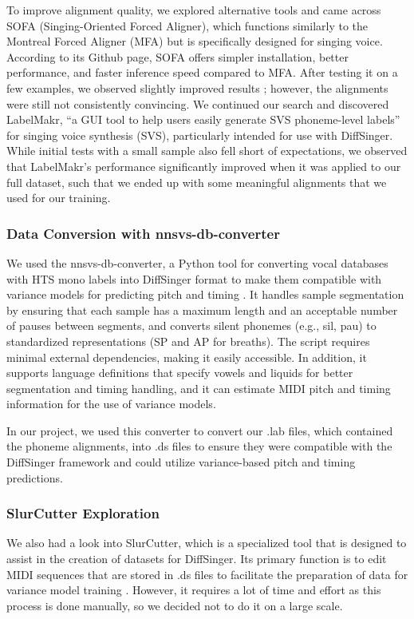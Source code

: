 \documentclass[a4paper]{article}
\begin{document}
To improve alignment quality, we explored alternative tools and came across SOFA (Singing-Oriented Forced Aligner), which functions similarly to the Montreal Forced Aligner (MFA) but is specifically designed for singing voice. According to its Github page, SOFA offers simpler installation, better performance, and faster inference speed compared to MFA. After testing it on a few examples, we observed slightly improved results \cite{Greenleaf2001}; however, the alignments were still not consistently convincing. We continued our search and discovered LabelMakr, “a GUI tool to help users easily generate SVS phoneme-level labels” \cite{spicytigermeat} for singing voice synthesis (SVS), particularly intended for use with DiffSinger. While initial tests with a small sample also fell short of expectations, we observed that LabelMakr's performance significantly improved when it was applied to our full dataset, such that we ended up with some meaningful alignments that we used for our training.

\subsubsection*{Data Conversion with nnsvs-db-converter}
We used the nnsvs-db-converter, a Python tool for converting vocal databases with HTS mono labels into DiffSinger format to make them compatible with variance models for predicting pitch and timing \cite{nnsvsdbconverter}. It handles sample segmentation by ensuring that each sample has a maximum length and an acceptable number of pauses between segments, and converts silent phonemes (e.g., sil, pau) to standardized representations (SP and AP for breaths). The script requires minimal external dependencies, making it easily accessible. In addition, it supports language definitions that specify vowels and liquids for better segmentation and timing handling, and it can estimate MIDI pitch and timing information for the use of variance models.

In our project, we used this converter to convert our .lab files, which contained the phoneme alignments, into .ds files to ensure they were compatible with the DiffSinger framework and could utilize variance-based pitch and timing predictions.

\subsubsection*{SlurCutter Exploration}
We also had a look into SlurCutter, which is a specialized tool that is designed to assist in the creation of datasets for DiffSinger. Its primary function is to edit MIDI sequences that are stored in .ds files to facilitate the preparation of data for variance model training \cite{openvpi}. However, it requires a lot of time and effort as this process is done manually, so we decided not to do it on a large scale.
\end{document}
